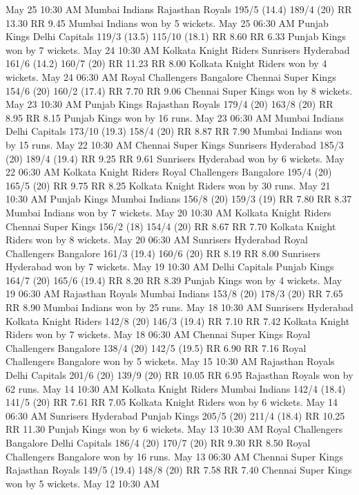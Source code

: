 May 25
10:30 AM
Mumbai Indians
Rajasthan Royals
195/5 (14.4)
189/4 (20)
RR 13.30
RR 9.45
Mumbai Indians won by 5 wickets.
May 25
06:30 AM
Punjab Kings
Delhi Capitals
119/3 (13.5)
115/10 (18.1)
RR 8.60
RR 6.33
Punjab Kings won by 7 wickets.
May 24
10:30 AM
Kolkata Knight Riders
Sunrisers Hyderabad
161/6 (14.2)
160/7 (20)
RR 11.23
RR 8.00
Kolkata Knight Riders won by 4 wickets.
May 24
06:30 AM
Royal Challengers Bangalore
Chennai Super Kings
154/6 (20)
160/2 (17.4)
RR 7.70
RR 9.06
Chennai Super Kings won by 8 wickets.
May 23
10:30 AM
Punjab Kings
Rajasthan Royals
179/4 (20)
163/8 (20)
RR 8.95
RR 8.15
Punjab Kings won by 16 runs.
May 23
06:30 AM
Mumbai Indians
Delhi Capitals
173/10 (19.3)
158/4 (20)
RR 8.87
RR 7.90
Mumbai Indians won by 15 runs.
May 22
10:30 AM
Chennai Super Kings
Sunrisers Hyderabad
185/3 (20)
189/4 (19.4)
RR 9.25
RR 9.61
Sunrisers Hyderabad won by 6 wickets.
May 22
06:30 AM
Kolkata Knight Riders
Royal Challengers Bangalore
195/4 (20)
165/5 (20)
RR 9.75
RR 8.25
Kolkata Knight Riders won by 30 runs.
May 21
10:30 AM
Punjab Kings
Mumbai Indians
156/8 (20)
159/3 (19)
RR 7.80
RR 8.37
Mumbai Indians won by 7 wickets.
May 20
10:30 AM
Kolkata Knight Riders
Chennai Super Kings
156/2 (18)
154/4 (20)
RR 8.67
RR 7.70
Kolkata Knight Riders won by 8 wickets.
May 20
06:30 AM
Sunrisers Hyderabad
Royal Challengers Bangalore
161/3 (19.4)
160/6 (20)
RR 8.19
RR 8.00
Sunrisers Hyderabad won by 7 wickets.
May 19
10:30 AM
Delhi Capitals
Punjab Kings
164/7 (20)
165/6 (19.4)
RR 8.20
RR 8.39
Punjab Kings won by 4 wickets.
May 19
06:30 AM
Rajasthan Royals
Mumbai Indians
153/8 (20)
178/3 (20)
RR 7.65
RR 8.90
Mumbai Indians won by 25 runs.
May 18
10:30 AM
Sunrisers Hyderabad
Kolkata Knight Riders
142/8 (20)
146/3 (19.4)
RR 7.10
RR 7.42
Kolkata Knight Riders won by 7 wickets.
May 18
06:30 AM
Chennai Super Kings
Royal Challengers Bangalore
138/4 (20)
142/5 (19.5)
RR 6.90
RR 7.16
Royal Challengers Bangalore won by 5 wickets.
May 15
10:30 AM
Rajasthan Royals
Delhi Capitals
201/6 (20)
139/9 (20)
RR 10.05
RR 6.95
Rajasthan Royals won by 62 runs.
May 14
10:30 AM
Kolkata Knight Riders
Mumbai Indians
142/4 (18.4)
141/5 (20)
RR 7.61
RR 7.05
Kolkata Knight Riders won by 6 wickets.
May 14
06:30 AM
Sunrisers Hyderabad
Punjab Kings
205/5 (20)
211/4 (18.4)
RR 10.25
RR 11.30
Punjab Kings won by 6 wickets.
May 13
10:30 AM
Royal Challengers Bangalore
Delhi Capitals
186/4 (20)
170/7 (20)
RR 9.30
RR 8.50
Royal Challengers Bangalore won by 16 runs.
May 13
06:30 AM
Chennai Super Kings
Rajasthan Royals
149/5 (19.4)
148/8 (20)
RR 7.58
RR 7.40
Chennai Super Kings won by 5 wickets.
May 12
10:30 AM
